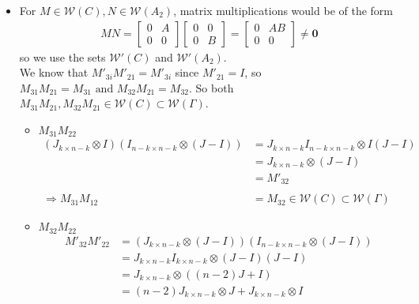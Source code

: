 \documentclass{article}
\begin{document}
\begin{itemize}
\begin{itemize}
        \item For $M\in\mathcal{W}(C),N \in \mathcal{W}(A_2)$, matrix multiplications would be of the form \\
        \begin{align*}
            MN = \begin{bmatrix}
                0 & A \\ 0 & 0
            \end{bmatrix}\begin{bmatrix}
                0&0\\0&B
            \end{bmatrix} = \begin{bmatrix}
                0&AB\\0&0
            \end{bmatrix} \neq \mathbf{0}
        \end{align*}
        so we use the sets $\mathcal{W'}(C)$ and $\mathcal{W'}(A_2)$. \\
        We know that $M'_{3i}M'_{21} = M'_{3i}$ since $M'_{21} = I$, so $M_{31}M_{21} = M_{31} \text{ and } M_{32}M_{21} = M_{32}$. So both $M_{31}M_{21}, M_{32}M_{21} \in \mathcal{W}(C) \subset\mathcal{W}(\Gamma)$.
        \begin{itemize}
            \item $M_{31}M_{22}$
            \begin{align*}
                (J_{k\times n-k}\otimes I)(I_{n-k\times n-k}\otimes (J-I))
                &= J_{k\times n-k}I_{n-k\times n-k} \otimes I(J-I) \\
                &= J_{k\times n-k}\otimes (J-I) \\
                &= M'_{32} \\ \\
                \Rightarrow M_{31}M_{12} &= M_{32} \in \mathcal{W}(C) \subset \mathcal{W}(\Gamma)
            \end{align*}
            \item $M_{32}M_{22}$
            \begin{align*}
                M'_{32}M'_{22}
                &= (J_{k\times n-k}\otimes (J-I))(I_{n-k\times n-k} \otimes (J-I)) \\
                &= J_{k\times n-k}I_{k\times n-k} \otimes (J-I)(J-I) \\
                &= J_{k\times n-k}\otimes((n-2)J + I) \\
                &= (n-2)J_{k\times n-k}\otimes J + J_{k\times n-k}\otimes I\\

\end{align*}
\end{itemize}
\end{itemize}
\end{itemize}
\end{document}
